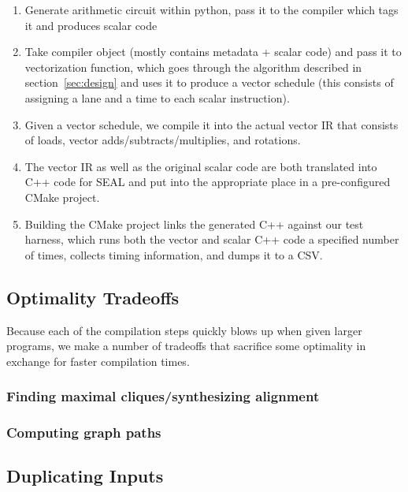 \begin{enumerate}
    \item Generate arithmetic circuit within python, pass it to the compiler which tags it and produces scalar code
    \item Take compiler object (mostly contains metadata + scalar code) and pass it to vectorization function, which goes through the algorithm described in section~\ref{sec:design} and uses it to produce a vector schedule (this consists of assigning a lane and a time to each scalar instruction).
    \item Given a vector schedule, we compile it into the actual vector IR that consists of loads, vector adds/subtracts/multiplies, and rotations.
    \item The vector IR as well as the original scalar code are both translated into C++ code for SEAL and put into the appropriate place in a pre-configured CMake project.
    \item Building the CMake project links the generated C++ against our test harness, which runs both the vector and scalar C++ code a specified number of times, collects timing information, and dumps it to a CSV.
\end{enumerate}

\subsection{Optimality Tradeoffs}
Because each of the compilation steps quickly blows up when given larger programs, we make a number of tradeoffs that sacrifice some optimality in exchange for faster compilation times.
\subsubsection*{Finding maximal cliques/synthesizing alignment}
\subsubsection*{Computing graph paths}

\subsection{Duplicating Inputs}